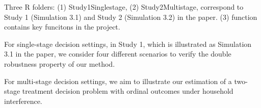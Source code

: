 Three R folders: (1) Study1Singlestage, (2) Study2Multistage, correspond to Study 1 (Simulation 3.1) and Study 2 (Simulation 3.2) in the paper. (3) function contains  key funcitons in the project. 

For single-stage decision settings, in Study 1, which is illustrated as Simulation 3.1 in the paper, we consider four different scenarios to verify the double robustness property of our method.

For multi-stage decision settings, we aim to illustrate our estimation of a two-stage treatment decision problem with ordinal outcomes under household interference. 